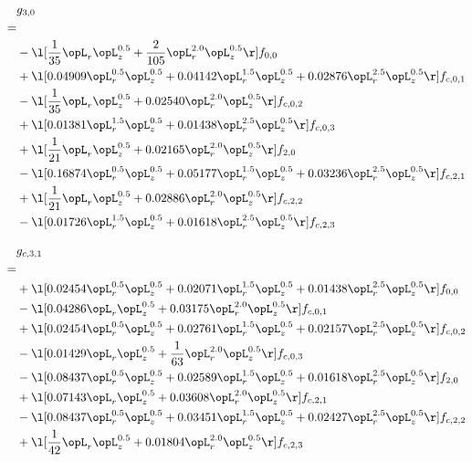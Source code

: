 \begin{alignat}{2} 
\label{eq:g_30_0} 
& g_{3,0} \nonumber \\ 
 = \\ 
& - \l[ \frac{1}{35} \opL_r \opL_z^{0.5} + \frac{2}{105} \opL_r^{2.0} \opL_z^{0.5}  \r] f_{0,0} \nonumber \\ 
& + \l[  0.04909 \opL_r^{0.5} \opL_z^{0.5} +  0.04142 \opL_r^{1.5} \opL_z^{0.5} +  0.02876 \opL_r^{2.5} \opL_z^{0.5}  \r] f_{c,0,1} \nonumber \\ 
& - \l[ \frac{1}{35} \opL_r \opL_z^{0.5} +  0.02540 \opL_r^{2.0} \opL_z^{0.5}  \r] f_{c,0,2} \nonumber \\ 
& + \l[  0.01381 \opL_r^{1.5} \opL_z^{0.5} +  0.01438 \opL_r^{2.5} \opL_z^{0.5}  \r] f_{c,0,3} \nonumber \\ 
& + \l[ \frac{1}{21} \opL_r \opL_z^{0.5} +  0.02165 \opL_r^{2.0} \opL_z^{0.5}  \r] f_{2,0} \nonumber \\ 
& - \l[  0.16874 \opL_r^{0.5} \opL_z^{0.5} +  0.05177 \opL_r^{1.5} \opL_z^{0.5} +  0.03236 \opL_r^{2.5} \opL_z^{0.5}  \r] f_{c,2,1} \nonumber \\ 
& + \l[ \frac{1}{21} \opL_r \opL_z^{0.5} +  0.02886 \opL_r^{2.0} \opL_z^{0.5}  \r] f_{c,2,2} \nonumber \\ 
& - \l[  0.01726 \opL_r^{1.5} \opL_z^{0.5} +  0.01618 \opL_r^{2.5} \opL_z^{0.5}  \r] f_{c,2,3} \nonumber \\ 
\end{alignat} 


\begin{alignat}{2} 
\label{eq:g_31_0} 
& g_{c,3,1} \nonumber \\ 
 = \\ 
& + \l[  0.02454 \opL_r^{0.5} \opL_z^{0.5} +  0.02071 \opL_r^{1.5} \opL_z^{0.5} +  0.01438 \opL_r^{2.5} \opL_z^{0.5}  \r] f_{0,0} \nonumber \\ 
& - \l[  0.04286 \opL_r \opL_z^{0.5} +  0.03175 \opL_r^{2.0} \opL_z^{0.5}  \r] f_{c,0,1} \nonumber \\ 
& + \l[  0.02454 \opL_r^{0.5} \opL_z^{0.5} +  0.02761 \opL_r^{1.5} \opL_z^{0.5} +  0.02157 \opL_r^{2.5} \opL_z^{0.5}  \r] f_{c,0,2} \nonumber \\ 
& - \l[  0.01429 \opL_r \opL_z^{0.5} + \frac{1}{63} \opL_r^{2.0} \opL_z^{0.5}  \r] f_{c,0,3} \nonumber \\ 
& - \l[  0.08437 \opL_r^{0.5} \opL_z^{0.5} +  0.02589 \opL_r^{1.5} \opL_z^{0.5} +  0.01618 \opL_r^{2.5} \opL_z^{0.5}  \r] f_{2,0} \nonumber \\ 
& + \l[  0.07143 \opL_r \opL_z^{0.5} +  0.03608 \opL_r^{2.0} \opL_z^{0.5}  \r] f_{c,2,1} \nonumber \\ 
& - \l[  0.08437 \opL_r^{0.5} \opL_z^{0.5} +  0.03451 \opL_r^{1.5} \opL_z^{0.5} +  0.02427 \opL_r^{2.5} \opL_z^{0.5}  \r] f_{c,2,2} \nonumber \\ 
& + \l[ \frac{1}{42} \opL_r \opL_z^{0.5} +  0.01804 \opL_r^{2.0} \opL_z^{0.5}  \r] f_{c,2,3} \nonumber \\ 
\end{alignat} 


